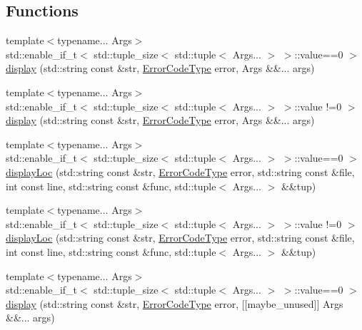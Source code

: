 \subsection*{Functions}
\begin{DoxyCompactItemize}
\item 
{\footnotesize template$<$typename... Args$>$ }\\std\+::enable\+\_\+if\+\_\+t$<$ std\+::tuple\+\_\+size$<$ std\+::tuple$<$ Args... $>$ $>$\+::value==0 $>$ \hyperlink{namespacevt_1_1error_a3079688a918c87c5ab5c638fad22ebcf}{display} (std\+::string const \&str, \hyperlink{namespacevt_a793764d753923abc3d32929870beb485}{Error\+Code\+Type} error, Args \&\&... args)
\item 
{\footnotesize template$<$typename... Args$>$ }\\std\+::enable\+\_\+if\+\_\+t$<$ std\+::tuple\+\_\+size$<$ std\+::tuple$<$ Args... $>$ $>$\+::value !=0 $>$ \hyperlink{namespacevt_1_1error_a37c5633fbfd11a19486f467819a330f5}{display} (std\+::string const \&str, \hyperlink{namespacevt_a793764d753923abc3d32929870beb485}{Error\+Code\+Type} error, Args \&\&... args)
\item 
{\footnotesize template$<$typename... Args$>$ }\\std\+::enable\+\_\+if\+\_\+t$<$ std\+::tuple\+\_\+size$<$ std\+::tuple$<$ Args... $>$ $>$\+::value==0 $>$ \hyperlink{namespacevt_1_1error_aa05507e862c21c1b4e3dbe29d86f05f6}{display\+Loc} (std\+::string const \&str, \hyperlink{namespacevt_a793764d753923abc3d32929870beb485}{Error\+Code\+Type} error, std\+::string const \&file, int const line, std\+::string const \&func, std\+::tuple$<$ Args... $>$ \&\&tup)
\item 
{\footnotesize template$<$typename... Args$>$ }\\std\+::enable\+\_\+if\+\_\+t$<$ std\+::tuple\+\_\+size$<$ std\+::tuple$<$ Args... $>$ $>$\+::value !=0 $>$ \hyperlink{namespacevt_1_1error_acc630b11da3783f4c6b4eab8f9d9c081}{display\+Loc} (std\+::string const \&str, \hyperlink{namespacevt_a793764d753923abc3d32929870beb485}{Error\+Code\+Type} error, std\+::string const \&file, int const line, std\+::string const \&func, std\+::tuple$<$ Args... $>$ \&\&tup)
\item 
{\footnotesize template$<$typename... Args$>$ }\\std\+::enable\+\_\+if\+\_\+t$<$ std\+::tuple\+\_\+size$<$ std\+::tuple$<$ Args... $>$ $>$\+::value==0 $>$ \hyperlink{namespacevt_1_1error_a2b3a36c6f424bac4312fa98eae1a269c}{display} (std\+::string const \&str, \hyperlink{namespacevt_a793764d753923abc3d32929870beb485}{Error\+Code\+Type} error, \mbox{[}\mbox{[}maybe\+\_\+unused\mbox{]}\mbox{]} Args \&\&... args)

\end{DoxyCompactItemize}
